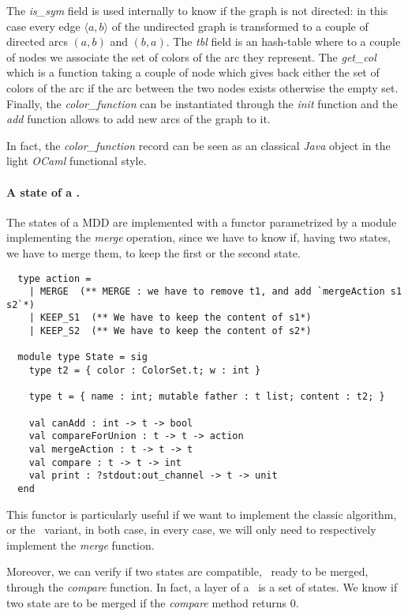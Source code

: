 The \textit{is\_sym} field is used internally to know if the graph is not directed: in this case every edge $\langle a, b \rangle$ of the undirected graph is transformed to a couple of directed arcs $(a,b)$ and $(b,a)$. The \textit{tbl} field is an hash-table where to a couple of nodes we associate the set of colors of the arc they represent. The \textit{get\_col} which is a function taking a couple of node which gives back either the set of colors of the arc if the arc between the two nodes exists otherwise the empty set. Finally, the \textit{color\_function} can be instantiated through the \textit{init} function and the \textit{add} function allows to add new arcs of the graph to it.

In fact, the \textit{color\_function} record can be seen as an classical \textit{Java} object in the light \textit{OCaml} functional style.

\paragraph{A state of a \mdd.} The states of a MDD are implemented with a functor\cite{ocamlfunctor} parametrized by a module implementing the \textit{merge} operation, since we have to know if, having two states, we have to merge them, to keep the first or the second state.

\begin{verbatim}
  type action =
    | MERGE  (** MERGE : we have to remove t1, and add `mergeAction s1 s2`*)
    | KEEP_S1  (** We have to keep the content of s1*)
    | KEEP_S2  (** We have to keep the content of s2*)

  module type State = sig
    type t2 = { color : ColorSet.t; w : int }

    type t = { name : int; mutable father : t list; content : t2; }

    val canAdd : int -> t -> bool
    val compareForUnion : t -> t -> action
    val mergeAction : t -> t -> t
    val compare : t -> t -> int
    val print : ?stdout:out_channel -> t -> unit
  end
\end{verbatim}

This functor is particularly useful if we want to implement the classic algorithm, or the \alldiff\ variant, in both case, in every case, we will only need to respectively implement the \textit{merge} function.

Moreover, we can verify if two states are compatible, \ie\ ready to be merged, through the \textit{compare} function. In fact, a layer of a \mdd\ is a set of states. We know if two state are to be merged if the \textit{compare} method returns $0$.

